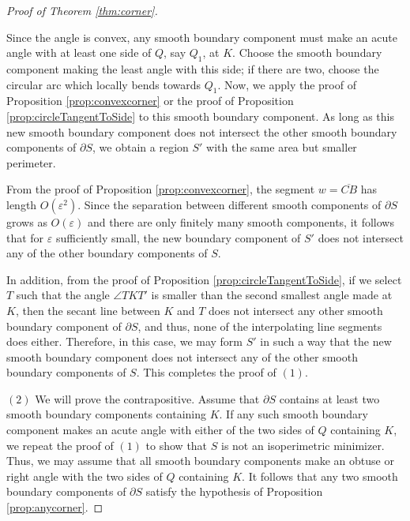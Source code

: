 \documentclass[leqno]{article}
\numberwithin{equation}{section}
\theoremstyle{definition}
\theoremstyle{remark}
\theoremstyle{plain}
\begin{document}
\begin{proof}[Proof of Theorem \ref{thm:corner}]
\begin{center}
\label{fig:tangent}
\end{center}

Since the angle is convex, any smooth boundary component must make an acute angle with at least one side of $Q$, say $Q_1$, at $K$.  Choose the smooth boundary component making the least angle with this side; if there are two, choose the circular arc which locally bends towards $Q_1$.  Now, we apply the proof of Proposition \ref{prop:convexcorner} or the proof of Proposition \ref{prop:circleTangentToSide} to this smooth boundary component. As long as this new smooth boundary component does not intersect the other smooth boundary components of $\partial S$, we obtain a region $S'$ with the same area but smaller perimeter.  

From the proof of Proposition \ref{prop:convexcorner}, the segment $w=\overline{CB}$ has length $O(\varepsilon^2)$.  Since the separation between different smooth components of $\partial S$ grows as $O(\varepsilon)$ and there are only finitely many smooth components, it follows that for $\varepsilon$ sufficiently small, the new boundary component of $S'$ does not intersect any of the other boundary components of $S$.

In addition, from the proof of Proposition \ref{prop:circleTangentToSide}, if we select $T$ such that the angle $\angle TKT'$ is smaller than the second smallest angle made at $K$, then the secant line between $K$ and $T$ does not intersect any other smooth boundary component of $\partial S$, and thus, none of the interpolating line segments does either. Therefore, in this case, we may form $S'$ in such a way that the new smooth boundary component does not intersect any of the other smooth boundary components of $S$. This completes the proof of $(1)$.

\bigskip

$(2)$  We will prove the contrapositive.  Assume that $\partial S$ contains at least two smooth boundary components containing $K$.  If any such smooth boundary component makes an acute angle with either of the two sides of $Q$ containing $K$, we repeat the proof of $(1)$ to show that $S$ is not an isoperimetric minimizer.  Thus, we may assume that all smooth boundary components make an obtuse or right angle with the two sides of $Q$ containing $K$.  It follows that any two smooth boundary components of $\partial S$ satisfy the hypothesis of Proposition \ref{prop:anycorner}.


\end{proof}
\end{document}
